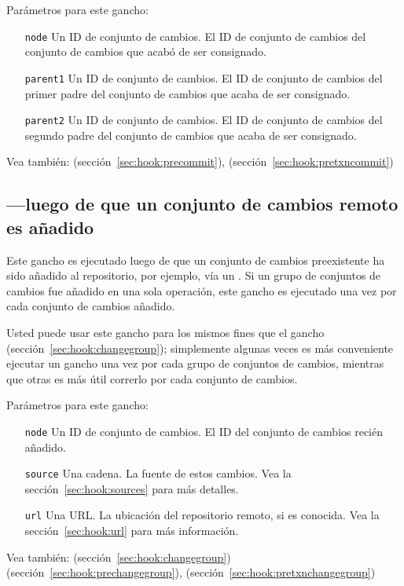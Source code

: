 Parámetros para este gancho:
\begin{itemize}
\item[\texttt{node}] Un ID de conjunto de cambios. El ID de conjunto
  de cambios del conjunto de cambios que acabó de ser consignado.
\item[\texttt{parent1}] Un ID de conjunto de cambios. El ID de
  conjunto de cambios del primer padre del conjunto de cambios que
  acaba de ser consignado.
\item[\texttt{parent2}] Un ID de conjunto de cambios. El ID de
  conjunto de cambios del segundo padre del conjunto de cambios que
  acaba de ser consignado.
\end{itemize}

Vea también:  (sección~\ref{sec:hook:precommit}),
 (sección~\ref{sec:hook:pretxncommit})

\subsection{---luego de que un conjunto de cambios
remoto es añadido}
\label{sec:hook:incoming}

Este gancho es ejecutado luego de que un conjunto de cambios
preexistente ha sido añadido al repositorio, por ejemplo, vía un
.  Si un grupo de conjuntos de cambios fue añadido en una
sola operación, este gancho es ejecutado una vez por cada conjunto de
cambios añadido.

Usted puede usar este gancho para los mismos fines que el gancho
 (sección~\ref{sec:hook:changegroup}); simplemente
algunas veces es más conveniente ejecutar un gancho una vez por cada
grupo de conjuntos de cambios, mientras que otras es más útil correrlo
por cada conjunto de cambios.

Parámetros para este gancho:
\begin{itemize}
\item[\texttt{node}] Un ID de conjunto de cambios. El ID del conjunto
  de cambios recién añadido.
\item[\texttt{source}] Una cadena. La fuente de estos cambios. Vea la
  sección~\ref{sec:hook:sources} para más detalles.
\item[\texttt{url}] Una URL. La ubicación del repositorio remoto, si
  es conocida. Vea la sección~\ref{sec:hook:url} para más información.
\end{itemize}

Vea también:  (sección~\ref{sec:hook:changegroup})
 (sección~\ref{sec:hook:prechangegroup}),
 (sección~\ref{sec:hook:pretxnchangegroup})

